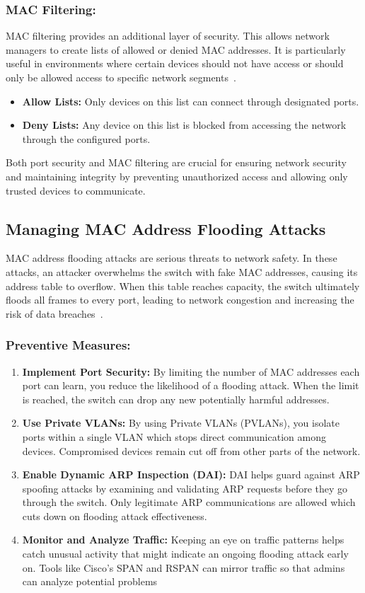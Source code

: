 \documentclass[11pt,a4paper]{article}
\begin{document}
\subsubsection*{MAC Filtering:} MAC filtering provides an additional layer of security. This allows network managers to create lists of allowed or denied MAC addresses. It is particularly useful in environments where certain devices should not have access or should only be allowed access to specific network segments~\cite{MAC-Filtering}.
    \begin{itemize}
        \item \textbf{Allow Lists:} Only devices on this list can connect through designated ports.
        \item \textbf{Deny Lists:} Any device on this list is blocked from accessing the network through the configured ports.
    \end{itemize}

Both port security and MAC filtering are crucial for ensuring network security and maintaining integrity by preventing unauthorized access and allowing only trusted devices to communicate.

\subsection*{Managing MAC Address Flooding Attacks}
MAC address flooding attacks are serious threats to network safety. In these attacks, an attacker overwhelms the switch with fake MAC addresses, causing its address table to overflow. When this table reaches capacity, the switch ultimately floods all frames to every port, leading to network congestion and increasing the risk of data breaches~\cite{MAC-Flooding}.

\subsubsection*{Preventive Measures:}
    \begin{enumerate}
        \item \textbf{Implement Port Security:} By limiting the number of MAC addresses each port can learn, you reduce the likelihood of a flooding attack. When the limit is reached, the switch can drop any new potentially harmful addresses.
        \item \textbf{Use Private VLANs:} By using Private VLANs (PVLANs), you isolate ports within a single VLAN which stops direct communication among devices. Compromised devices remain cut off from other parts of the network.
        \item \textbf{Enable Dynamic ARP Inspection (DAI):} DAI helps guard against ARP spoofing attacks by examining and validating ARP requests before they go through the switch. Only legitimate ARP communications are allowed which cuts down on flooding attack effectiveness.
        \item \textbf{Monitor and Analyze Traffic:} Keeping an eye on traffic patterns helps catch unusual activity that might indicate an ongoing flooding attack early on. Tools like Cisco's SPAN and RSPAN can mirror traffic so that admins can analyze potential problems 
    \end{enumerate}
\end{document}
